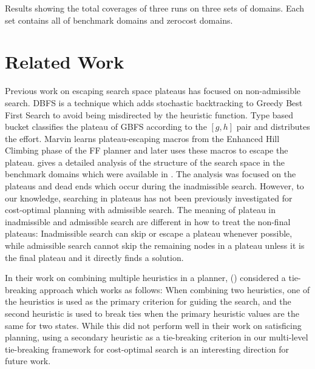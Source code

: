 \begin{table}[tb]
 \centering {}
 
 \caption{Results showing the total coverages of three runs on three sets
 of domains. Each set contains all of benchmark domains and zerocost
 domains.} \label{actionordering-robustness}
\end{table}


\section{Related Work}
\label{sec-4}

Previous work on escaping search space plateaus has focused on
non-admissible search.  DBFS \cite{imai2011novel} is a technique which
adds stochastic backtracking to Greedy Best First Search to avoid
being misdirected by the heuristic function. Type based bucket
\cite{xie14type} classifies the plateau of GBFS according to the
$[g,h]$ pair and distributes the effort.  Marvin \cite{Coles07} learns plateau-escaping macros
from the Enhanced Hill Climbing phase of the FF planner
\cite{Hoffmann01} and later uses these macros to escape the plateau.
\citeauthor{Hoffmann05} gives a detailed analysis of the
structure of the search space in the benchmark domains which were
available in \citeyear{Hoffmann05} \cite{Hoffmann05,Hoffmann14}. 
The analysis was focused on the plateaus and dead ends which occur during the inadmissible search.
% 
However, to our knowledge, searching in plateaus has not been
previously investigated for cost-optimal planning with admissible
search.
The meaning of plateau in inadmissible and admissible search are
different in how to treat the non-final plateaus: Inadmissible search can
skip or escape a plateau whenever possible, while
admissible search cannot skip the remaining nodes in a plateau unless it
is the final plateau and it directly finds a solution.

In their work on combining multiple heuristics in a planner, \citeauthor{RogerH10}
(\citeyear{RogerH10}) considered a tie-breaking approach which works as follows:
When combining two heuristics, one of the
heuristics is used as the primary criterion for guiding the search,
and the second heuristic is used to break ties when the primary
heuristic values are the same for two states.
While this did not perform well in their work on satisficing planning, 
using a secondary heuristic as a tie-breaking criterion in our multi-level tie-breaking framework 
for cost-optimal search is an interesting direction for future work.

